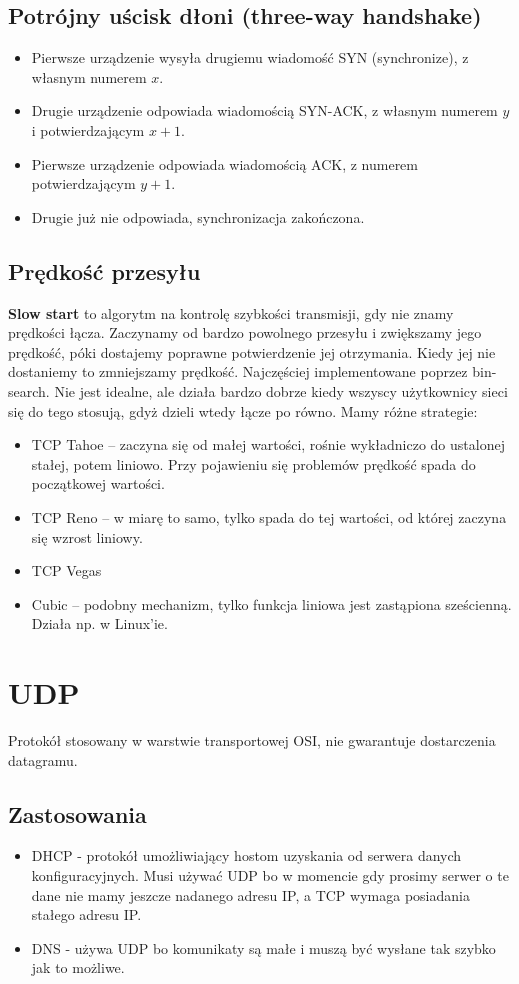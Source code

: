 \subsection{Potrójny uścisk dłoni (three-way handshake)}
\label{handshake}
\begin{itemize}
	\item Pierwsze urządzenie wysyła drugiemu wiadomość SYN (synchronize), z własnym numerem \(x\).
	\item Drugie urządzenie odpowiada wiadomością SYN-ACK, z własnym numerem \(y\) i potwierdzającym \(x+1\).
	\item Pierwsze urządzenie odpowiada wiadomością ACK, z numerem potwierdzającym \(y+1\).
	\item Drugie już nie odpowiada, synchronizacja zakończona.
\end{itemize}

\subsection{Prędkość przesyłu}
\textbf{Slow start} to algorytm na kontrolę szybkości transmisji, gdy nie znamy prędkości łącza. Zaczynamy od bardzo powolnego przesyłu i zwiększamy jego prędkość, póki dostajemy poprawne potwierdzenie jej otrzymania. Kiedy jej nie dostaniemy to zmniejszamy prędkość. Najczęściej implementowane poprzez bin-search. Nie jest idealne, ale działa bardzo dobrze kiedy wszyscy użytkownicy sieci się do tego stosują, gdyż dzieli wtedy łącze po równo. Mamy różne strategie:
\begin{itemize}
	\item TCP Tahoe -- zaczyna się od małej wartości, rośnie wykładniczo do ustalonej stałej, potem liniowo. Przy pojawieniu się problemów prędkość spada do początkowej wartości.
	\item TCP Reno -- w miarę to samo, tylko spada do tej wartości, od której zaczyna się wzrost liniowy.
	\item TCP Vegas
	\item Cubic -- podobny mechanizm, tylko funkcja liniowa jest zastąpiona sześcienną. Działa np. w Linux'ie.
\end{itemize}

\section{UDP}
Protokół stosowany w warstwie transportowej OSI, nie gwarantuje dostarczenia datagramu.

\subsection{Zastosowania}
\begin{itemize}
	\item DHCP - protokół umożliwiający hostom uzyskania od serwera danych konfiguracyjnych. Musi używać UDP bo w momencie gdy prosimy serwer o te dane nie mamy jeszcze nadanego adresu IP, a TCP wymaga posiadania stałego adresu IP.
	\item DNS - używa UDP bo komunikaty są małe i muszą być wysłane tak szybko jak to możliwe.
\end{itemize}

